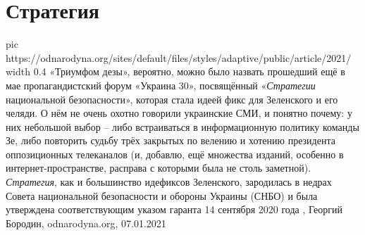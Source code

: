  
 
 
 
 
\chapter{Стратегия}

\ifcmt
  pic https://odnarodyna.org/sites/default/files/styles/adaptive/public/article/2021/%
	width 0.4
\fi
«Триумфом дезы», вероятно, можно было назвать прошедший ещё в мае
пропагандистский форум «Украина 30», посвящённый «\emph{Стратегии} национальной
безопасности», которая стала идеей фикс для Зеленского и его челяди. О нём не
очень охотно говорили украинские СМИ, и понятно почему: у них небольшой выбор –
либо встраиваться в информационную политику команды Зе, либо повторить судьбу
трёх закрытых по велению и хотению президента оппозиционных телеканалов (и,
добавлю, ещё множества изданий, особенно в интернет-пространстве, расправа с
которыми была не столь заметной).  \emph{Стратегия}, как и большинство
идефиксов Зеленского, зародилась в недрах Совета национальной безопасности и
обороны Украины (СНБО) и была утверждена соответствующим указом гаранта 14
сентября 2020 года
, Георгий Бородин, odnarodyna.org, 07.01.2021
